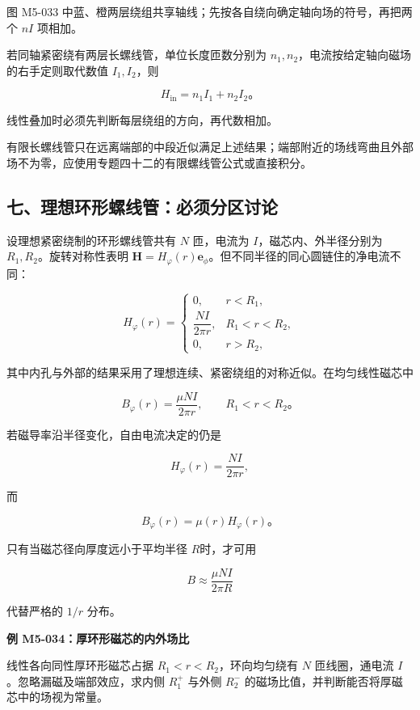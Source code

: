 图 M5-033
中蓝、橙两层绕组共享轴线；先按各自绕向确定轴向场的符号，再把两个 \(nI\)
项相加。

若同轴紧密绕有两层长螺线管，单位长度匝数分别为
\(n_1,n_2\)，电流按给定轴向磁场的右手定则取代数值 \(I_1,I_2\)，则

\[
H_{\mathrm{in}}=n_1I_1+n_2I_2\text{。}
\]

线性叠加时必须先判断每层绕组的方向，再代数相加。

有限长螺线管只在远离端部的中段近似满足上述结果；端部附近的场线弯曲且外部场不为零，应使用专题四十二的有限螺线管公式或直接积分。

\subsection{七、理想环形螺线管：必须分区讨论}\label{m5:ux4e03ux7406ux60f3ux73afux5f62ux87baux7ebfux7ba1ux5fc5ux987bux5206ux533aux8ba8ux8bba}

设理想紧密绕制的环形螺线管共有 \(N\) 匝，电流为
\(I\)，磁芯内、外半径分别为 \(R_1,R_2\)。旋转对称性表明
\(\mathbf H=H_{\varphi}(r)\mathbf e_{\phi}\)。但不同半径的同心圆链住的净电流不同：

\[
H_{\varphi}(r)=
\begin{cases}
0,&r<R_1,\\[4pt]
\dfrac{NI}{2\pi r},&R_1<r<R_2,\\[8pt]
0,&r>R_2,
\end{cases}
\]

其中内孔与外部的结果采用了理想连续、紧密绕组的对称近似。在均匀线性磁芯中

\[
\boxed{B_{\varphi}(r)=\frac{\mu NI}{2\pi r}},
\qquad R_1<r<R_2\text{。}
\]

若磁导率沿半径变化，自由电流决定的仍是

\[
H_{\varphi}(r)=\frac{NI}{2\pi r},
\]

而

\[
B_{\varphi}(r)=\mu(r)H_{\varphi}(r)\text{。}
\]

只有当磁芯径向厚度远小于平均半径 \(R\)时，才可用

\[
B\approx\frac{\mu NI}{2\pi R}
\]

代替严格的 \(1/r\) 分布。

\par{}
\noindent\begin{minipage}{\linewidth}

\textbf{例 M5-034：厚环形磁芯的内外场比}

线性各向同性厚环形磁芯占据 \(R_1<r<R_2\)，环向均匀绕有 \(N\)
匝线圈，通电流 \(I\)。忽略漏磁及端部效应，求内侧 \(R_1^+\) 与外侧
\(R_2^-\) 的磁场比值，并判断能否将厚磁芯中的场视为常量。

\end{minipage}\par

